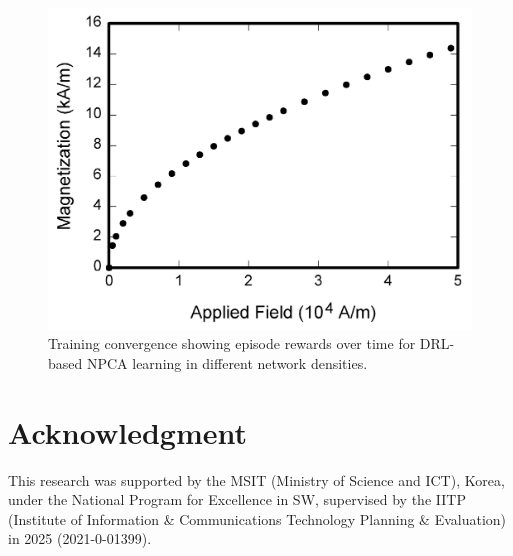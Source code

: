 \documentclass[conference]{IEEEtran}
\begin{document}
\begin{figure}[htbp]
\centerline{\includegraphics{fig1.png}}
\caption{Training convergence showing episode rewards over time for DRL-based NPCA learning in different network densities.}
\label{fig:training}
\end{figure}

\section*{Acknowledgment}

This research was supported by the MSIT (Ministry of Science and ICT), Korea, under the National Program for Excellence in SW, supervised by the IITP (Institute of Information \& Communications Technology Planning \& Evaluation) in 2025 (2021-0-01399).




\end{document}
